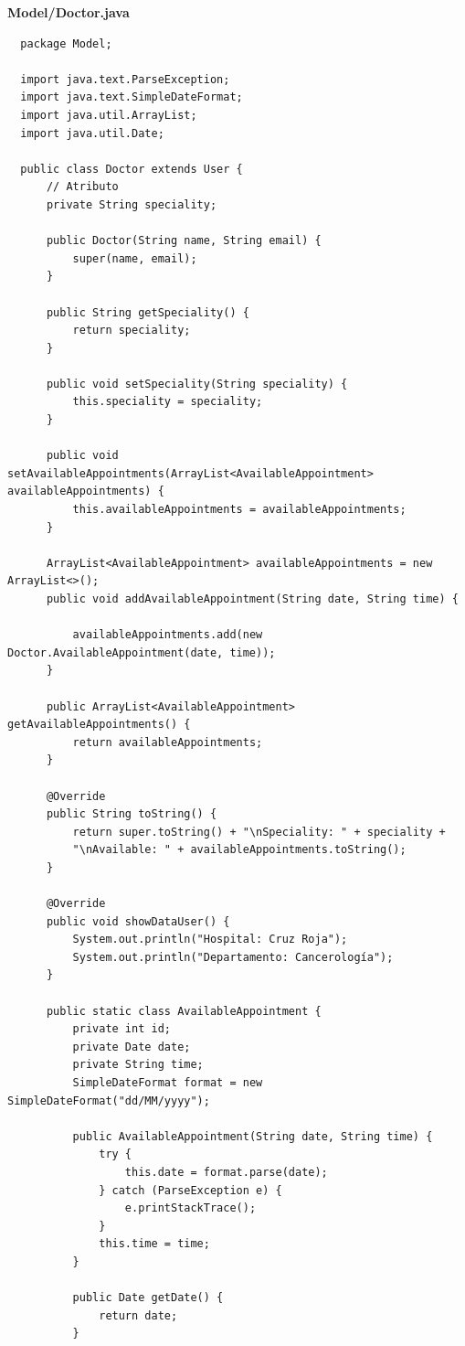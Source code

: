 \documentclass{article}
\begin{document}
\textbf{Model/Doctor.java}
\begin{verbatim}
  package Model;

  import java.text.ParseException;
  import java.text.SimpleDateFormat;
  import java.util.ArrayList;
  import java.util.Date;

  public class Doctor extends User {
      // Atributo
      private String speciality;

      public Doctor(String name, String email) {
          super(name, email);
      }

      public String getSpeciality() {
          return speciality;
      }

      public void setSpeciality(String speciality) {
          this.speciality = speciality;
      }

      public void setAvailableAppointments(ArrayList<AvailableAppointment> availableAppointments) {
          this.availableAppointments = availableAppointments;
      }

      ArrayList<AvailableAppointment> availableAppointments = new ArrayList<>();
      public void addAvailableAppointment(String date, String time) {

          availableAppointments.add(new Doctor.AvailableAppointment(date, time));
      }

      public ArrayList<AvailableAppointment> getAvailableAppointments() {
          return availableAppointments;
      }

      @Override
      public String toString() {
          return super.toString() + "\nSpeciality: " + speciality +
          "\nAvailable: " + availableAppointments.toString();
      }

      @Override
      public void showDataUser() {
          System.out.println("Hospital: Cruz Roja");
          System.out.println("Departamento: Cancerología");
      }

      public static class AvailableAppointment {
          private int id;
          private Date date;
          private String time;
          SimpleDateFormat format = new SimpleDateFormat("dd/MM/yyyy");

          public AvailableAppointment(String date, String time) {
              try {
                  this.date = format.parse(date);
              } catch (ParseException e) {
                  e.printStackTrace();
              }
              this.time = time;
          }

          public Date getDate() {
              return date;
          }


\end{verbatim}
\end{document}
